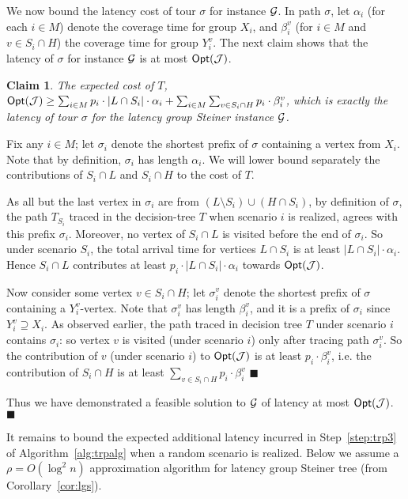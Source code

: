 \documentclass[11pt]{article}
\newtheorem{claim}[thm]{Claim}
\def\opt{{\sf Opt}\xspace}
\def\js{\ensuremath{\mathcal{J}}}
\newenvironment{pf}{

\noindent{\bf Proof:}} {\hfill$\blacksquare$


}
\begin{document}
\begin{pf}
We now bound the latency cost of tour $\sigma$ for instance ${\cal G}$. In path $\sigma$, let $\alpha_i$ (for each
$i\in M$) denote the coverage time for group $X_i$,
  and $\beta_i^v$ (for $i\in M$ and $v\in S_i\cap H$) the coverage time for group $Y_i^v$.
  The next claim shows that the latency of $\sigma$ for instance ${\cal G}$ is at most $\opt(\js)$.


\begin{claim} The expected cost of $T$, $\opt(\js)\ge \sum_{i\in M} p_i\cdot |L\cap S_i|\cdot \alpha_i + \sum_{i\in
M} \sum_{v\in S_i\cap H} p_i\cdot \beta_i^v$, which is exactly the latency of tour $\sigma$ for the latency group
Steiner instance ${\cal G}$.
\end{claim}
\begin{pf}
Fix any $i \in M$; let $\sigma_i$ denote the shortest prefix of $\sigma$ containing a vertex from $X_i$. Note that by
definition, $\sigma_i$ has length $\alpha_i$. We will lower bound separately the contributions of $S_i\cap L$ and
$S_i\cap H$ to the cost of $T$.

As all but the last vertex in $\sigma_i$ are from $(L\setminus S_i)\cup (H\cap S_i)$, by definition of $\sigma$,
the path $T_{S_i}$ traced in the decision-tree $T$ when scenario $i$ is realized, agrees with this prefix $\sigma_i$. Moreover,
no vertex of $S_i\cap L$ is visited before the end of $\sigma_i$. So under scenario $S_i$, the total arrival time for vertices $L\cap S_i$ is at least $|L\cap S_i|\cdot \alpha_i$. Hence $S_i\cap
L$ contributes  at least $p_i\cdot|L\cap S_i|\cdot \alpha_i$ towards $\opt(\js)$.

Now consider some vertex $v\in S_i\cap H$; let $\sigma_i^v$ denote the shortest prefix of $\sigma$ containing a
$Y_i^v$-vertex. Note that $\sigma_i^v$ has length $\beta_i^v$, and it is a prefix of $\sigma_i$ since $Y^v_i\supseteq
X_i$. As observed earlier, the path traced in decision tree $T$ under scenario $i$  contains $\sigma_i$: so vertex
$v$ is visited (under scenario $i$) only after tracing path $\sigma_i^v$. So the contribution of $v$ (under scenario
$i$) to $\opt(\js)$ is at least $p_i\cdot\beta_i^v$, i.e. the contribution of $S_i\cap H$ is at least $\sum_{v\in
S_i\cap H} p_i\cdot \beta_i^v$
\end{pf}


Thus we have demonstrated a feasible solution to ${\cal G}$ of  latency at most $\opt(\js)$.
\end{pf}

It remains to bound the expected additional latency incurred in Step~\ref{step:trp3} of Algorithm~\ref{alg:trpalg} when
a random scenario is realized. Below we assume a $\rho=O(\log^2n)$ approximation algorithm for latency group Steiner tree (from Corollary~\ref{cor:lgs}).
\end{document}
